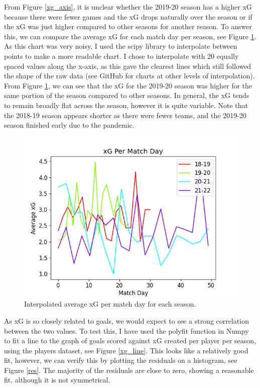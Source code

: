 \documentclass[12pt, a4paper, twocolumn]{article}
\begin{document}
From Figure \ref{xg_axis}, it is unclear whether the 2019-20 season has a higher xG because there were fewer games and the xG drops naturally over the season or if the xG was just higher compared to other seasons for another reason. To answer this, we can compare the average xG for each match day per season, see Figure \ref{xg_match}. As this chart was very noisy, I used the scipy library to interpolate between points to make a more readable chart. I chose to interpolate with 20 equally spaced values along the x-axis, as this gave the clearest lines which still followed the shape of the raw data (see GitHub\cite{git} for charts at other levels of interpolation). From Figure \ref{xg_match}, we can see that the xG for the 2019-20 season was higher for the same portion of the season compared to other seasons. In general, the xG tends to remain broadly flat across the season, however it is quite variable. Note that the 2018-19 season appears shorter as there were fewer teams, and the 2019-20 season finished early due to the pandemic.

\begin{figure}
  \includegraphics[width=\linewidth]{../vis/fixtures/xg_matchday20.png}
  \caption{Interpolated average xG per match day for each season.}
  \label{xg_match}
\end{figure}

As xG is so closely related to goals, we would expect to see a strong correlation between the two values. To test this, I have used the polyfit function in Numpy to fit a line to the graph of goals scored against xG created per player per season, using the players dataset, see Figure \ref{xg_line}. This looks like a relatively good fit, however, we can verify this by plotting the residuals on a histogram, see Figure \ref{res}. The majority of the residuals are close to zero, showing a reasonable fit, although it is not symmetrical.
\end{document}

